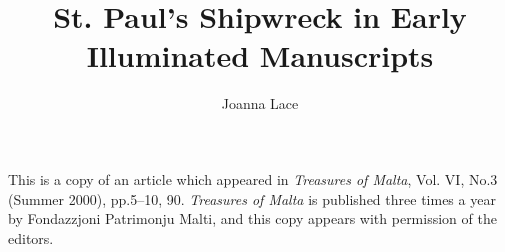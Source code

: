 \documentclass[a4paper,12pt]{article}
\begin{document}
\title{St. Paul's Shipwreck in Early Illuminated Manuscripts}
\author{Joanna Lace}
\date{}
\maketitle


{\narrower
This is a copy of an article which appeared in
{\it Treasures of Malta},
Vol. VI, No.3 (Summer 2000), pp.5--10, 90. 
{\it Treasures of Malta} is published three times a year by
Fondazzjoni Patrimonju Malti, and this copy appears with permission of
the editors.
}
\end{document}
